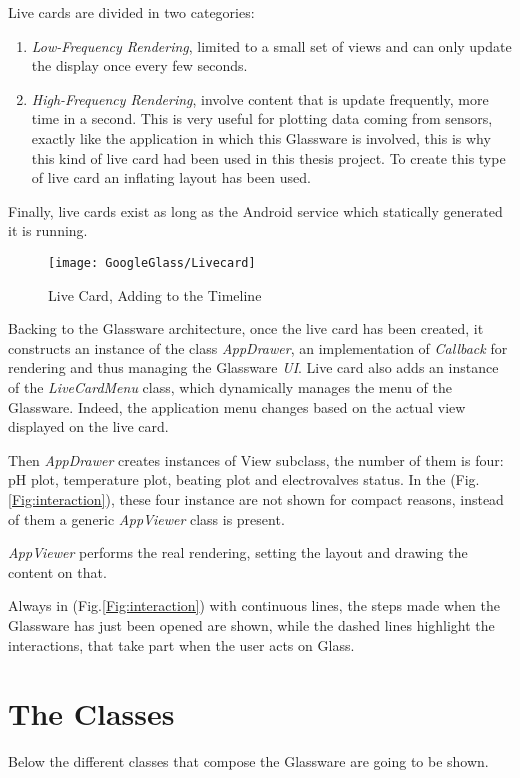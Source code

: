 Live cards are divided in two categories:
\begin{enumerate}
	\item \textit{Low-Frequency Rendering}, limited to a small set of views and can only update the display once every few seconds.
	\item \textit{High-Frequency Rendering}, involve content that is update frequently, more time in a second. This is very useful for plotting data coming from sensors, exactly like the application in which this Glassware is involved, this is why this kind of live card had been used in this thesis project. To create this type of live card an inflating layout has been used.
\end{enumerate}

Finally, live cards exist as long as the Android service which statically generated it is running.

\begin{figure}[h]
	\centering
	\texttt{[image: GoogleGlass/Livecard]}
	\caption{Live Card, Adding to the Timeline}
	\label{Fig:livecard}
\end{figure}

Backing to the Glassware architecture, once the live card has been created, it constructs an instance of the class \textit{AppDrawer}, an implementation of \textit{Callback} for rendering and thus managing the Glassware \textit{UI}. Live card also adds an instance of the \textit{LiveCardMenu} class, which dynamically manages the menu of the Glassware. Indeed, the application menu changes based on the actual view displayed on the live card.

Then \textit{AppDrawer} creates instances of View subclass, the number of them is four: pH plot, temperature plot, beating plot and electrovalves status. In the (Fig.\ref{Fig:interaction}), these four instance are not shown for compact reasons, instead of them a generic \textit{AppViewer} class is present.

\textit{AppViewer} performs the real rendering, setting the layout and drawing the content on that.

Always in (Fig.\ref{Fig:interaction}) with continuous lines, the steps made when the Glassware has just been opened are shown, while the dashed lines highlight the interactions, that take part when the user acts on Glass.

\section{The Classes}
Below the different classes that compose the Glassware are going to be shown.
